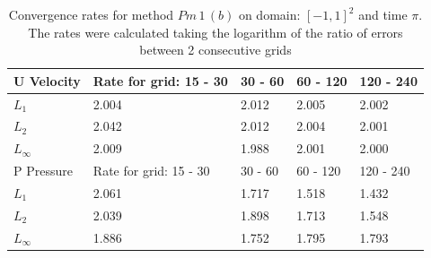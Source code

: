 \newpage
\begin{table}	
\centering
\begin{tabular}{|l|l|l|l|l|}
	\hline
	U Velocity & Rate for grid: 15 - 30 & 30 - 60 & 60 - 120 & 120 - 240\\
	\hline
	$L_1$ & 2.004 & 2.012 & 2.005 & 2.002\\
	$L_2$ & 2.042 & 2.012 & 2.004 & 2.001\\
	$L_\infty$ & 2.009 & 1.988 & 2.001 & 2.000\\
	\hline
	P Pressure &  Rate for grid: 15 - 30 & 30 - 60 & 60 - 120 & 120 - 240\\
	\hline
	$L_1$ & 2.061 & 1.717 & 1.518 & 1.432\\
	$L_2$ & 2.039 & 1.898 & 1.713 & 1.548\\
	$L_\infty$ & 1.886 & 1.752 & 1.795 & 1.793\\
	\hline
\end{tabular}
\caption{Convergence rates for method $Pm\,1\,(b)$ on domain: $[-1,1]^2$ and time $\pi$. The rates were calculated taking the logarithm of the ratio of errors between 2 consecutive grids}\label{table:1}
\end{table}


